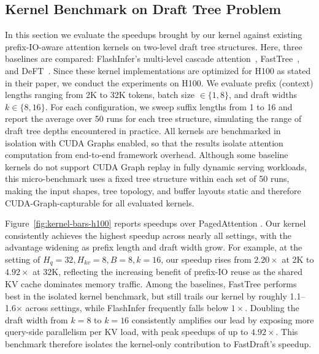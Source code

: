 \documentclass{article}
\begin{document}
\subsection{Kernel Benchmark on Draft Tree Problem}
\label{subsec:kernel_bench}
In this section we evaluate the speedups brought by our kernel against existing prefix-IO-aware attention kernels on two-level draft tree structures.  
Here, three baselines are compared: FlashInfer's multi-level cascade attention~\cite{ye2025flashinferefficientcustomizableattention}, FastTree~\cite{pan2025fasttree}, and DeFT~\cite{yao2025deftdecodingflashtreeattention}. Since these kernel implementations are optimized for H100 as stated in their paper, we conduct the experiments on H100.
We evaluate prefix (context) lengths ranging from 2K to 32K tokens, batch size $\in \{1, 8\}$, and draft widths $k \in \{8, 16\}$. For each configuration, we sweep suffix lengths from 1 to 16 and report the average over 50 runs for each tree structure, simulating the range of draft tree depths encountered in practice. All kernels are benchmarked in isolation with CUDA Graphs enabled, so that the results isolate attention computation from end-to-end framework overhead. Although some baseline kernels do not support CUDA Graph replay in fully dynamic serving workloads, this micro-benchmark uses a fixed tree structure within each set of 50 runs, making the input shapes, tree topology, and buffer layouts static and therefore CUDA-Graph-capturable for all evaluated kernels.

Figure~\ref{fig:kernel-bars-h100} reports speedups over PagedAttention \cite{kwon2023efficientmemorymanagementlarge}. Our kernel consistently achieves the highest speedup across nearly all settings, with the advantage widening as prefix length and draft width grow. For example, at the setting of $H_q{=}32, H_{kv}{=}8, B{=}8, k{=}16$, our speedup rises from $2.20\times$ at 2K to $4.92\times$ at 32K, reflecting the increasing benefit of prefix-IO reuse as the shared KV cache dominates memory traffic. Among the baselines, FastTree performs best in the isolated kernel benchmark, but still trails our kernel by roughly 1.1--1.6$\times$ across settings, while FlashInfer frequently falls below $1\times$. Doubling the draft width from $k{=}8$ to $k{=}16$ consistently amplifies our lead by exposing more query-side parallelism per KV load, with peak speedups of up to $4.92\times$. This benchmark therefore isolates the kernel-only contribution to FastDraft's speedup.
\end{document}
